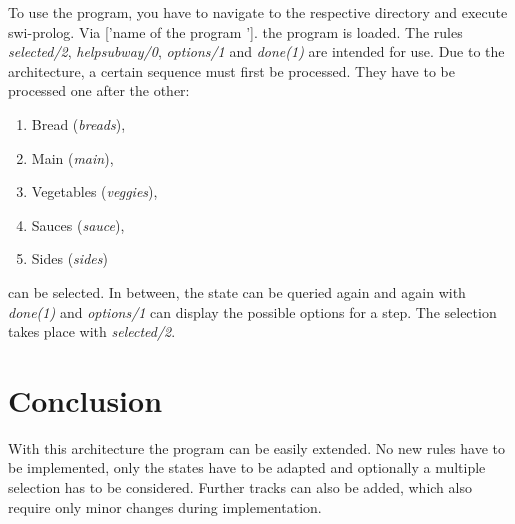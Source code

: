 \documentclass{article}
\begin{document}
	To use the program, you have to navigate to the respective directory and execute swi-prolog. Via ['name of the program ']. the program is loaded. The rules \textit{selected/2}, \textit{helpsubway/0}, \textit{options/1} and \textit{done(1)} are intended for use. Due to the architecture, a certain sequence must first be processed. They have to be processed one after the other:
	\begin{enumerate}
		\item Bread (\textit{breads}),
		\item Main (\textit{main}), 
		\item Vegetables (\textit{veggies}), 
		\item Sauces (\textit{sauce}),
		\item Sides (\textit{sides})
	\end{enumerate}
	 can be selected. In between, the state can be queried again and again with \textit{done(1)} and \textit{options/1} can display the possible options for a step. The selection takes place with \textit{selected/2}.
	
	\section{Conclusion}
	With this architecture the program can be easily extended. No new rules have to be implemented, only the states have to be adapted and optionally a multiple selection has to be considered. Further tracks can also be added, which also require only minor changes during implementation.
\end{document}
